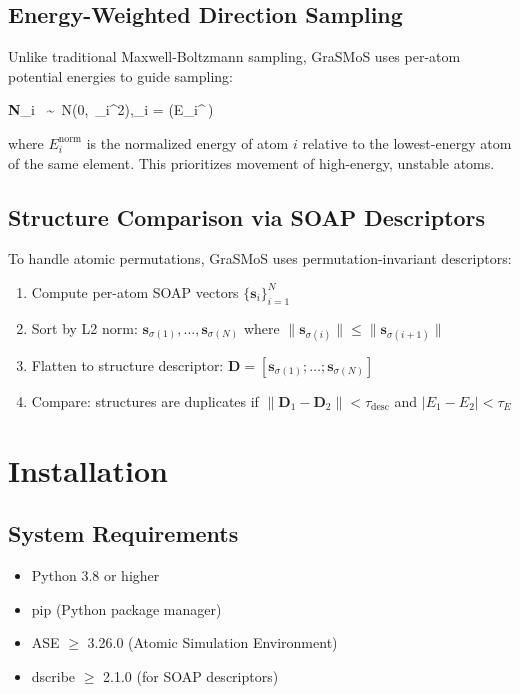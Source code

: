 \documentclass[11pt,a4paper]{article}
\begin{document}
\subsection{Energy-Weighted Direction Sampling}
Unlike traditional Maxwell-Boltzmann sampling, GraSMoS uses per-atom potential energies to guide sampling:

\begin{center}
\textbf{N}_i \ \sim\  N(0,\ \sigma_i^2),\qquad \sigma_i =  \cdot \exp\!\bigl(E_i^{\,}\bigr)
\end{center}

where $E_i^{\text{norm}}$ is the normalized energy of atom $i$ relative to the lowest-energy atom of the same element. This prioritizes movement of high-energy, unstable atoms.

\subsection{Structure Comparison via SOAP Descriptors}
To handle atomic permutations, GraSMoS uses permutation-invariant descriptors:

\begin{enumerate}
    \item Compute per-atom SOAP vectors $\{\mathbf{s}_i\}_{i=1}^N$
    \item Sort by L2 norm: $\mathbf{s}_{\sigma(1)}, \ldots, \mathbf{s}_{\sigma(N)}$ where $\|\mathbf{s}_{\sigma(i)}\| \leq \|\mathbf{s}_{\sigma(i+1)}\|$
    \item Flatten to structure descriptor: $\mathbf{D} = [\mathbf{s}_{\sigma(1)}; \ldots; \mathbf{s}_{\sigma(N)}]$
    \item Compare: structures are duplicates if $\|\mathbf{D}_1 - \mathbf{D}_2\| < \tau_{\text{desc}}$ and $|E_1 - E_2| < \tau_E$
\end{enumerate}

\section{Installation}

\subsection{System Requirements}
\begin{itemize}
    \item Python 3.8 or higher
    \item pip (Python package manager)
    \item ASE $\geq$ 3.26.0 (Atomic Simulation Environment)
    \item dscribe $\geq$ 2.1.0 (for SOAP descriptors)
\end{itemize}
\end{document}
